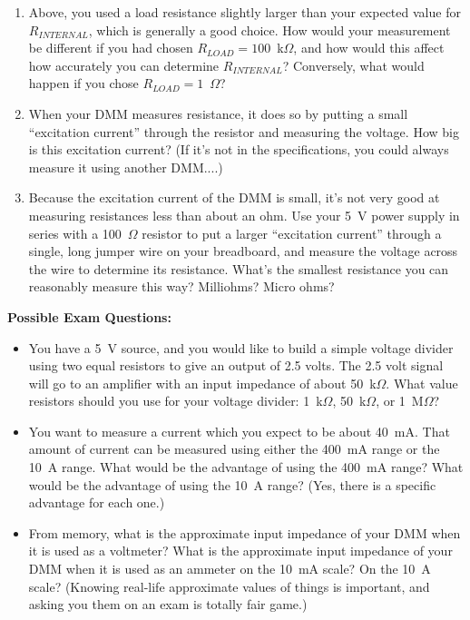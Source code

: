 \begin{enumerate}[wide]
\item Above, you used a load resistance slightly larger than your expected value for $R_{INTERNAL}$, which is generally a good choice.  How would your measurement be different if you had chosen  $R_{LOAD} = 100$~k$\Omega$, and how  would this affect how accurately you can determine $R_{INTERNAL}$?  Conversely, what would happen if you chose $R_{LOAD} = 1$~$\Omega$?  

\item When your DMM measures resistance, it does so by putting a small ``excitation current'' through the resistor and measuring the voltage.  How big is this excitation current?   (If it's not in the specifications, you could always measure it using another DMM....) 

\item Because the excitation current of the DMM is small, it's not very good at measuring resistances less than about an ohm.  Use your 5~V power supply in series with a 100~$\Omega$ resistor to put a larger ``excitation current'' through a single, long jumper wire on your breadboard, and measure the voltage across the wire to determine its resistance.  What's the smallest resistance you can reasonably measure this way?  Milliohms?  Micro ohms?  

\end{enumerate}


\textbf{Possible Exam Questions:}

\begin{itemize}
\item You have a 5~V source, and you would like to build a simple voltage divider using two equal resistors to give an output of 2.5 volts.  The 2.5 volt signal will go to an amplifier with an input impedance of about 50~k$\Omega$.  What value resistors should you use for your voltage divider: 1~k$\Omega$, 50~k$\Omega$, or 1~M$\Omega$?

\item You want to measure a current which you expect to be about 40~mA.  That amount of current can be measured using either the 400~mA range or the 10~A range.  What would be the advantage of using the 400~mA range?  What would be the advantage of using the 10~A range? (Yes, there is a specific advantage for each one.)  

\item From memory, what is the approximate input impedance of your DMM when it is used as a voltmeter?  What is the approximate input impedance of your DMM when it is used as an ammeter on the 10~mA scale?  On the 10~A scale?  (Knowing real-life approximate values of things is important, and asking you them on an exam is totally fair game.)
\end{itemize}




